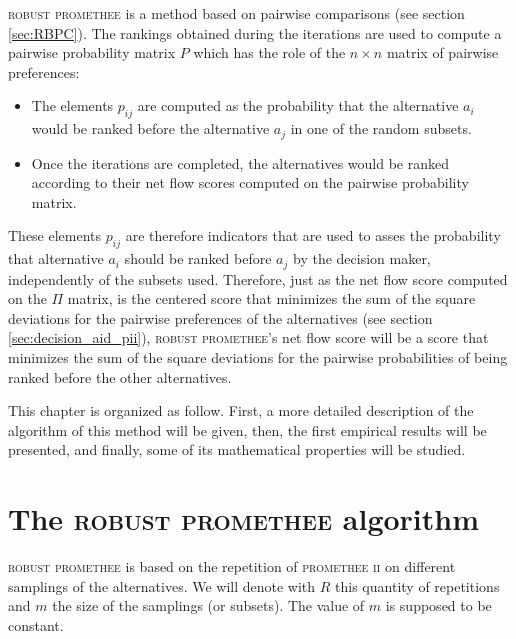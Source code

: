 \newpage 

\textsc{robust promethee} is a method based on pairwise comparisons (see section \ref{sec:RBPC}).
The rankings obtained during the iterations are used to compute a pairwise probability matrix $P$ which has the role of the $n \times n$ matrix of pairwise preferences:
\begin{itemize}
    \item The elements $p_{ij}$ are computed as the probability that the alternative $a_i$ would be ranked before the alternative $a_j$ in one of the random subsets.
    \item Once the iterations are completed, the alternatives would be ranked according to their net flow scores computed on the pairwise probability matrix.
\end{itemize}

These elements $p_{ij}$ are therefore indicators that are used to asses the probability that alternative $a_i$ should be ranked before $a_j$ by the decision maker, independently of the subsets used.
Therefore, just as the net flow score computed on the $\Pi$ matrix, is the centered score that minimizes the sum of the square deviations for the pairwise preferences of the alternatives (see section \ref{sec:decision_aid_pii}), \textsc{robust promethee}'s net flow score will be a score that minimizes the sum of the square deviations for the pairwise probabilities of being ranked before the other alternatives.

This chapter is organized as follow.
First, a more detailed description of the algorithm of this method will be given, then, the first empirical results will be presented, and finally, some of its mathematical properties will be studied.

\section{The \textsc{robust promethee} algorithm}

\textsc{robust promethee} is based on the repetition of \textsc{promethee ii} on different samplings of the alternatives.
We will denote with $R$ this quantity of repetitions and $m$ the size of the samplings (or subsets).
The value of $m$ is supposed to be constant. 

